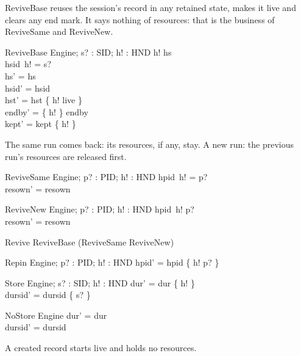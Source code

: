 \documentclass[a4paper,10pt,fleqn]{article}
\begin{document}
ReviveBase reuses the session's record in any retained state, makes it live
and clears any end mark.  It says nothing of resources: that is the business
of ReviveSame and ReviveNew.

\begin{schema}{ReviveBase}
  \Delta Engine; s? : SID; h! : HND
\where
  h! \in hs \\
  hsid~h! = s? \\
  hs' = hs \\
  hsid' = hsid \\
  hst' = hst \oplus \{ h! \mapsto live \} \\
  endby' = \{ h! \} \ndres endby \\
  kept' = kept \setminus \{ h! \}
\end{schema}

The same run comes back: its resources, if any, stay.  A new run: the
previous run's resources are released first.

\begin{schema}{ReviveSame}
  \Delta Engine; p? : PID; h! : HND
\where
  hpid~h! = p? \\
  resown' = resown
\end{schema}

\begin{schema}{ReviveNew}
  \Delta Engine; p? : PID; h! : HND
\where
  hpid~h! \neq p? \\
  resown' = resown
\end{schema}

\begin{zed}
  Revive  ReviveBase \land (ReviveSame \lor ReviveNew)
\end{zed}

\begin{schema}{Repin}
  \Delta Engine; p? : PID; h! : HND
\where
  hpid' = hpid \oplus \{ h! \mapsto p? \}
\end{schema}

\begin{schema}{Store}
  \Delta Engine; s? : SID; h! : HND
\where
  dur' = dur \cup \{ h! \} \\
  dursid' = dursid \cup \{ s? \}
\end{schema}

\begin{schema}{NoStore}
  \Delta Engine
\where
  dur' = dur \\
  dursid' = dursid
\end{schema}

A created record starts live and holds no resources.
\end{document}
